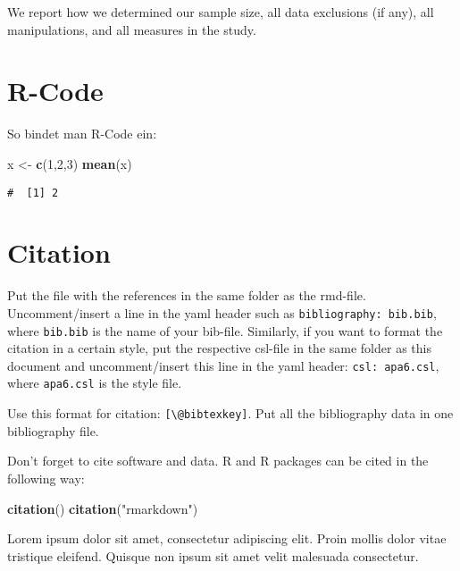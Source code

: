 \documentclass[11pt,ngerman,a4paper,oneside]{article}
\newenvironment{Shaded}{\begin{snugshade}}{\end{snugshade}}
\newcommand{\DecValTok}[1]{\textcolor[rgb]{0.00,0.00,0.81}{#1}}
\newcommand{\KeywordTok}[1]{\textcolor[rgb]{0.13,0.29,0.53}{\textbf{#1}}}
\newcommand{\NormalTok}[1]{#1}
\newcommand{\StringTok}[1]{\textcolor[rgb]{0.31,0.60,0.02}{#1}}
\begin{document}
We report how we determined our sample size, all data exclusions (if
any), all manipulations, and all measures in the study.

\hypertarget{r-code}{%
\section{R-Code}\label{r-code}}

So bindet man R-Code ein:

\begin{Shaded}
\begin{Highlighting}[]
\NormalTok{x \textless{}{-}}\StringTok{ }\KeywordTok{c}\NormalTok{(}\DecValTok{1}\NormalTok{,}\DecValTok{2}\NormalTok{,}\DecValTok{3}\NormalTok{)}
\KeywordTok{mean}\NormalTok{(x)}
\end{Highlighting}
\end{Shaded}

\begin{verbatim}
#  [1] 2
\end{verbatim}

\hypertarget{citation}{%
\section{Citation}\label{citation}}

Put the file with the references in the same folder as the rmd-file.
Uncomment/insert a line in the yaml header such as
\texttt{bibliography:\ bib.bib}, where \texttt{bib.bib} is the name of
your bib-file. Similarly, if you want to format the citation in a
certain style, put the respective csl-file in the same folder as this
document and uncomment/insert this line in the yaml header:
\texttt{csl:\ apa6.csl}, where \texttt{apa6.csl} is the style file.

Use this format for citation: \texttt{{[}\textbackslash{}@bibtexkey{]}}.
Put all the bibliography data in one bibliography file.

Don't forget to cite software and data. R and R packages can be cited in
the following way:

\begin{Shaded}
\begin{Highlighting}[]
\KeywordTok{citation}\NormalTok{()}
\KeywordTok{citation}\NormalTok{(}\StringTok{"rmarkdown"}\NormalTok{)}
\end{Highlighting}
\end{Shaded}

Lorem ipsum dolor sit amet, consectetur adipiscing elit. Proin mollis
dolor vitae tristique eleifend. Quisque non ipsum sit amet velit
malesuada consectetur.
\end{document}
